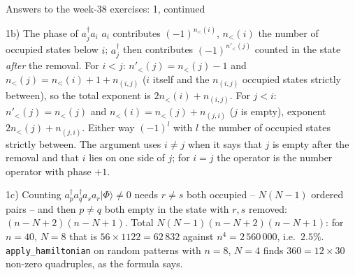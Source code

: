 \documentclass[aspectratio=169,10pt]{beamer}
\newcommand{\ket}[1]{\vert #1\rangle}
\begin{document}
\begin{frame}{Answers to the week-38 exercises: 1, continued}
  \footnotesize
  \begin{block}{1b) The phase of $a_j^{\dagger}a_i$}
    $a_i$ contributes $(-1)^{n_<(i)}$, $n_<(i)$ the number of occupied states below $i$; $a_j^{\dagger}$ then contributes $(-1)^{n'_<(j)}$ counted in the state \emph{after} the removal. For $i<j$: $n'_<(j)=n_<(j)-1$ and $n_<(j)=n_<(i)+1+n_{(i,j)}$ ($i$ itself and the $n_{(i,j)}$ occupied states strictly between), so the total exponent is $2n_<(i)+n_{(i,j)}$. For $j<i$: $n'_<(j)=n_<(j)$ and $n_<(i)=n_<(j)+n_{(j,i)}$ ($j$ is empty), exponent $2n_<(j)+n_{(j,i)}$. Either way $(-1)^{l}$ with $l$ the number of occupied states strictly between. The argument uses $i\ne j$ when it says that $j$ is empty after the removal and that $i$ lies on one side of $j$; for $i=j$ the operator is the number operator with phase $+1$.
  \end{block}
  \begin{block}{1c) Counting}
    $a_p^{\dagger}a_q^{\dagger}a_sa_r\ket{\Phi}\ne0$ needs $r\ne s$ both occupied -- $N(N-1)$ ordered pairs -- and then $p\ne q$ both empty in the state with $r,s$ removed: $(n-N+2)(n-N+1)$. Total $N(N-1)(n-N+2)(n-N+1)$: for $n=40$, $N=8$ that is $56\times1122=62\,832$ against $n^4=2\,560\,000$, i.e.\ $2.5\%$. \texttt{apply\_hamiltonian} on random patterns with $n=8$, $N=4$ finds $360=12\times30$ non-zero quadruples, as the formula says.
  \end{block}
\end{frame}
\end{document}
